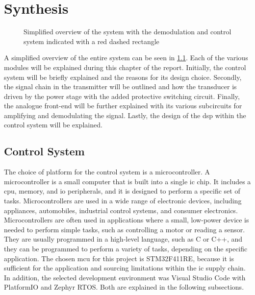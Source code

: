 \chapter{Synthesis} \label{cha:synthesis} \thispagestyle{main}

\begin{figure}[ht]
	\centering
	\resizebox{\textwidth}{!}{
		
	}
	\caption[Simplified overview of the system]{Simplified overview of the system with the demodulation and control system indicated with a red dashed rectangle}
	\label{fig:1_system_overview}
\end{figure}
A simplified overview of the entire system can be seen in \cref{fig:1_system_overview}. Each of the various modules will be explained during this chapter of the report. Initially, the control system will be briefly explained and the reasons for its design choice. Secondly, the signal chain in the transmitter will be outlined and how the transducer is driven by the power stage with the added protective switching circuit. Finally, the analogue front-end will be further explained with its various subcircuits for amplifying and demodulating the signal. Lastly, the design of the \gls{dsp} within the control system will be explained.

\section{Control System}
The choice of platform for the control system is a microcontroller. A microcontroller is a small computer that is built into a single \gls{ic} chip. It includes a \gls{cpu}, memory, and \gls{io} peripherals, and it is designed to perform a specific set of tasks. Microcontrollers are used in a wide range of electronic devices, including appliances, automobiles, industrial control systems, and consumer electronics. Microcontrollers are often used in applications where a small, low-power device is needed to perform simple tasks, such as controlling a motor or reading a sensor. They are usually programmed in a high-level language, such as C or C++, and they can be programmed to perform a variety of tasks, depending on the specific application. The chosen \gls{mcu} for this project is STM32F411RE, because it is sufficient for the application and sourcing limitations within the \gls{ic} supply chain. In addition, the selected development environment was Visual Studio Code with PlatformIO and Zephyr RTOS. Both are explained in the following subsections.

